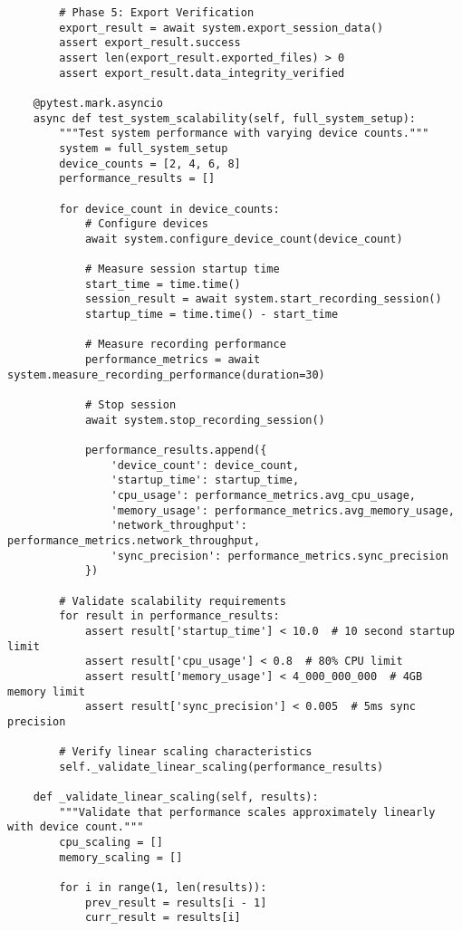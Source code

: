 \documentclass[11pt,a4paper]{report}
\begin{document}
\begin{verbatim}
        # Phase 5: Export Verification
        export_result = await system.export_session_data()
        assert export_result.success
        assert len(export_result.exported_files) > 0
        assert export_result.data_integrity_verified

    @pytest.mark.asyncio
    async def test_system_scalability(self, full_system_setup):
        """Test system performance with varying device counts."""
        system = full_system_setup
        device_counts = [2, 4, 6, 8]
        performance_results = []

        for device_count in device_counts:
            # Configure devices
            await system.configure_device_count(device_count)

            # Measure session startup time
            start_time = time.time()
            session_result = await system.start_recording_session()
            startup_time = time.time() - start_time

            # Measure recording performance
            performance_metrics = await system.measure_recording_performance(duration=30)

            # Stop session
            await system.stop_recording_session()

            performance_results.append({
                'device_count': device_count,
                'startup_time': startup_time,
                'cpu_usage': performance_metrics.avg_cpu_usage,
                'memory_usage': performance_metrics.avg_memory_usage,
                'network_throughput': performance_metrics.network_throughput,
                'sync_precision': performance_metrics.sync_precision
            })

        # Validate scalability requirements
        for result in performance_results:
            assert result['startup_time'] < 10.0  # 10 second startup limit
            assert result['cpu_usage'] < 0.8  # 80% CPU limit
            assert result['memory_usage'] < 4_000_000_000  # 4GB memory limit
            assert result['sync_precision'] < 0.005  # 5ms sync precision

        # Verify linear scaling characteristics
        self._validate_linear_scaling(performance_results)

    def _validate_linear_scaling(self, results):
        """Validate that performance scales approximately linearly with device count."""
        cpu_scaling = []
        memory_scaling = []

        for i in range(1, len(results)):
            prev_result = results[i - 1]
            curr_result = results[i]


\end{verbatim}
\end{document}
